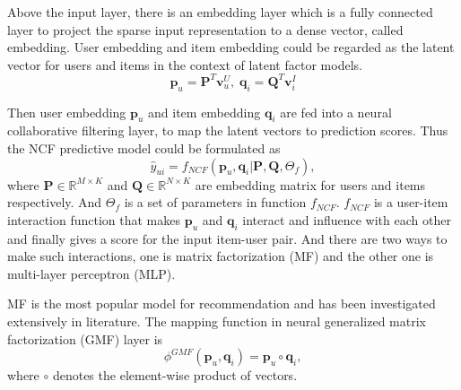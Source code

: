 Above the input layer, there is an embedding layer which is a fully connected layer to project the sparse input representation to a dense vector, called embedding.  User embedding and item embedding could be regarded as the latent vector for users and items in the context of latent factor models. 
\begin{equation}
    \mathbf{p}_u = \mathbf{P}^T\mathbf{v}_u^{U}, \; \mathbf{q}_i = \mathbf{Q}^T\mathbf{v}_i^I
\end{equation}

Then user embedding $\mathbf{p}_u$ and item embedding $\mathbf{q}_i$ are fed into a neural collaborative filtering layer, to map the latent vectors to prediction scores. Thus the NCF predictive model could be formulated as 
\begin{equation}
\hat{y}_{ui} = f_{NCF}(\mathbf{p}_u, \mathbf{q}_i| \mathbf{P}, \mathbf{Q}, \Theta_f),
\end{equation}
where $\mathbf{P} \in \mathbb{R}^{M \times K}$ and $\mathbf{Q} \in \mathbb{R}^{N \times K}$ are embedding matrix for users and items respectively. And $\Theta_f$ is a set of parameters in function $f_{NCF}$. $f_{NCF}$ is a user-item interaction function that makes $\mathbf{p}_u$ and $\mathbf{q}_i$ interact and influence with each other and finally gives a score for the input item-user pair. And there are two ways to make such interactions, one is matrix factorization (MF) and the other one is multi-layer perceptron (MLP). 

MF is the most popular model for recommendation and has been investigated extensively in literature\cite{MF}. The mapping function in  neural generalized matrix factorization (GMF) layer is 
\begin{equation}
    \phi^{GMF}(\mathbf{p}_u, \mathbf{q}_i) = \mathbf{p}_u \circ \mathbf{q}_i ,
\end{equation}
where $\circ$ denotes the element-wise product of vectors. 


